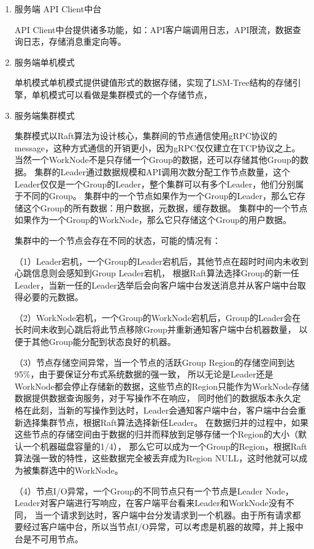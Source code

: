 		\begin{enumerate}[fullwidth,itemindent=2em,listparindent=2em]
			\item 服务端 API Client中台
			
			API Client中台提供诸多功能，如：API客户端调用日志，API限流，数据查询日志，存储消息重定向等。

			\item 服务端单机模式
			
			单机模式单机模式提供键值形式的数据存储，实现了LSM-Tree结构的存储引擎，单机模式可以看做是集群模式的一个存储节点，
			
			\item 服务端集群模式
			
			集群模式以Raft算法为设计核心，集群间的节点通信使用gRPC协议的message，这种方式通信的开销更小，因为gRPC仅仅建立在TCP协议之上。
			当然一个WorkNode不是只存储一个Group的数据，还可以存储其他Group的数据。
			集群的Leader通过数据规模和API调用次数分配工作节点数量，这个Leader仅仅是一个Group的Leader，整个集群可以有多个Leader，他们分别属于不同的Group。
			集群中的一个节点如果作为一个Group的Leader，那么它存储这个Group的所有数据：用户数据，元数据，缓存数据。
			集群中的一个节点如果作为一个Group的WorkNode，那么它只存储这个Group的用户数据。
			
			集群中的一个节点会存在不同的状态，可能的情况有：
	
			（1）Leader宕机，一个Group的Leader宕机后，其他节点在超时时间内未收到心跳信息则会感知到Group Leader宕机，
			根据Raft算法选择Group的新一任Leader，当新一任的Leader选举后会向客户端中台发送消息并从客户端中台取得必要的元数据。
			
			（2）WorkNode宕机，一个Group的WorkNode宕机后，Group的Leader会在长时间未收到心跳后将此节点移除Group并重新通知客户端中台机器数量，
			以便于其他Group能分配到状态良好的机器。
			
			（3）节点存储空间异常，当一个节点的活跃Group Region的存储空间到达95\%，由于要保证分布式系统数据的强一致，
			所以无论是Leader还是WorkNode都会停止存储新的数据，这些节点的Region只能作为WorkNode存储数据提供数据查询服务，对于写操作不在响应，
			同时他们的数据版本永久定格在此刻，当新的写操作到达时，Leader会通知客户端中台，客户端中台会重新选择集群节点，根据Raft算法选择新任Leader。
			在数据归并的过程中，如果这些节点的存储空间由于数据的归并而释放到足够存储一个Region的大小（默认一个机器磁盘容量的1/4），
			那么它可以成为一个Group的Region，根据Raft算法强一致的特性，这些数据完全被丢弃成为Region NULL，这时他就可以成为被集群选中的WorkNode。
	
			（4）节点I/O异常，一个Group的不同节点只有一个节点是Leader Node，Leader对客户端进行写响应，在客户端平台看来Leader和WorkNode没有不同，
			当一个请求到达时，客户端中台分发请求到一个机器。由于所有请求都要经过客户端中台，所以当节点I/O异常，可以考虑是机器的故障，并上报中台是不可用节点。
	

\end{enumerate}
